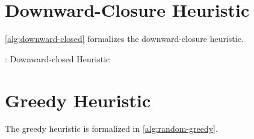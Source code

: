 \documentclass[11pt]{article}
\newcommand\sse{\subseteq}
\begin{document}
\section{Downward-Closure Heuristic}

\label{app:downward-closed}

\autoref{alg:downward-closed} formalizes the downward-closure heuristic.

\begin{algorithm}[h]
  \caption{: Downward-closed Heuristic}
  \label{alg:downward-closed}
\begin{algorithmic}[1]
  \For{$P' \sse P, |P'| = s'$}
        \EndIf
  \EndFor{}
  \EndFunction
\end{algorithmic}
\end{algorithm}

\section{Greedy Heuristic}

\label{app:greedy}

The greedy heuristic is formalized in \autoref{alg:random-greedy}.
\end{document}
